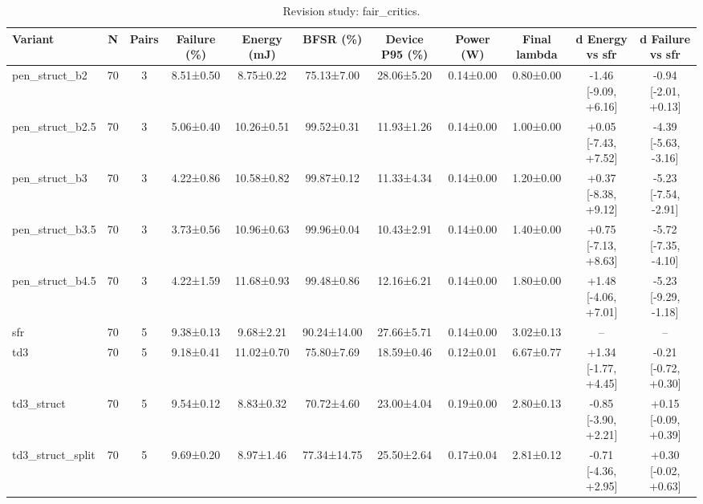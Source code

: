 \begin{table}[t]
\centering
\caption{Revision study: fair_critics.}
\label{tab:rev_fair_critics}
\footnotesize
\setlength{\tabcolsep}{3pt}
\begin{tabular}{lcccccccccc}
\hline
Variant & N & Pairs & Failure (\%) & Energy (mJ) & BFSR (\%) & Device P95 (\%) & Power (W) & Final lambda & d Energy vs sfr & d Failure vs sfr \\
\hline
pen\_struct\_b2 & 70 & 3 & 8.51±0.50 & 8.75±0.22 & 75.13±7.00 & 28.06±5.20 & 0.14±0.00 & 0.80±0.00 & -1.46 [-9.09, +6.16] & -0.94 [-2.01, +0.13] \\
pen\_struct\_b2.5 & 70 & 3 & 5.06±0.40 & 10.26±0.51 & 99.52±0.31 & 11.93±1.26 & 0.14±0.00 & 1.00±0.00 & +0.05 [-7.43, +7.52] & -4.39 [-5.63, -3.16] \\
pen\_struct\_b3 & 70 & 3 & 4.22±0.86 & 10.58±0.82 & 99.87±0.12 & 11.33±4.34 & 0.14±0.00 & 1.20±0.00 & +0.37 [-8.38, +9.12] & -5.23 [-7.54, -2.91] \\
pen\_struct\_b3.5 & 70 & 3 & 3.73±0.56 & 10.96±0.63 & 99.96±0.04 & 10.43±2.91 & 0.14±0.00 & 1.40±0.00 & +0.75 [-7.13, +8.63] & -5.72 [-7.35, -4.10] \\
pen\_struct\_b4.5 & 70 & 3 & 4.22±1.59 & 11.68±0.93 & 99.48±0.86 & 12.16±6.21 & 0.14±0.00 & 1.80±0.00 & +1.48 [-4.06, +7.01] & -5.23 [-9.29, -1.18] \\
sfr & 70 & 5 & 9.38±0.13 & 9.68±2.21 & 90.24±14.00 & 27.66±5.71 & 0.14±0.00 & 3.02±0.13 & -- & -- \\
td3 & 70 & 5 & 9.18±0.41 & 11.02±0.70 & 75.80±7.69 & 18.59±0.46 & 0.12±0.01 & 6.67±0.77 & +1.34 [-1.77, +4.45] & -0.21 [-0.72, +0.30] \\
td3\_struct & 70 & 5 & 9.54±0.12 & 8.83±0.32 & 70.72±4.60 & 23.00±4.04 & 0.19±0.00 & 2.80±0.13 & -0.85 [-3.90, +2.21] & +0.15 [-0.09, +0.39] \\
td3\_struct\_split & 70 & 5 & 9.69±0.20 & 8.97±1.46 & 77.34±14.75 & 25.50±2.64 & 0.17±0.04 & 2.81±0.12 & -0.71 [-4.36, +2.95] & +0.30 [-0.02, +0.63] \\
\hline
\end{tabular}
\end{table}
